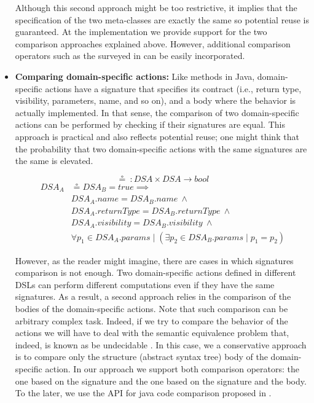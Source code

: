 \begin{itemize}
\vspace{2mm}
\hspace{3mm} Although this second approach might be too restrictive, it implies that the specification of the two meta-classes are exactly the same so potential reuse is guaranteed. At the implementation we provide support for the two comparison approaches explained above. However, additional comparison operators such as the surveyed in \cite{Lafi:2011} can be easily incorporated.

\vspace{2mm}

\item \textbf{Comparing domain-specific actions:} Like methods in Java, domain-specific actions have a signature that specifies its contract (i.e., return type, visibility, parameters, name, and so on), and a body where the behavior is actually implemented. In that sense, the comparison of two domain-specific actions can be performed by checking if their signatures are equal. This approach is practical and also reflects potential reuse; one might think that the probability that two domain-specific actions with the same signatures are the same is elevated.

\begin{equation}
  \circeq~: DSA \times DSA \rightarrow bool
\end{equation}
\vspace{-1mm}
\begin{equation}
\begin{split}
  DSA_{A} & \circeq DSA_{B} = true \implies \\
   & DSA_{A}.name = DSA_{B}.name ~ \wedge \\
   & DSA_{A}.returnType = DSA_{B}.returnType ~ \wedge \\
   & DSA_{A}.visibility = DSA_{B}.visibility ~ \wedge \\
   & \forall p_1 \in DSA_{A}.params \mid (\exists p_2 \in DSA_{B}.params \mid p_1 = p_2)
 \end{split}
\end{equation}

\vspace{2mm}
\hspace{3mm} However, as the reader might imagine, there are cases in which signatures comparison is not enough. Two domain-specific actions defined in different DSLs can perform different computations even if they have the same signatures. As a result, a second approach relies in the comparison of the bodies of the domain-specific actions. Note that such comparison can be arbitrary complex task. Indeed, if we try to compare  the behavior of the actions we will have to deal with the semantic equivalence problem that, indeed, is known as be undecidable \cite{Lucanu:2013}. In this case, we a conservative approach is to compare only the structure (abstract syntax tree) body of the domain-specific action. In our approach we support both comparison operators: the one based on the signature and the one based on the signature and the body. To the later, we use the API for java code comparison proposed in \cite{Biegel:2010}. 


\end{itemize}
